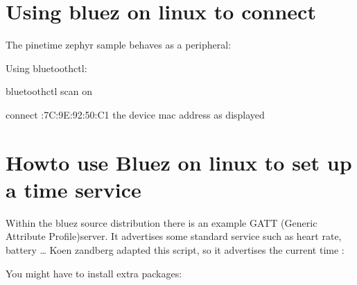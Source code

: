 \documentclass[letterpaper,10pt,english]{sphinxmanual}
\begin{document}
\section{Using bluez on linux to connect}
\label{\detokenize{current-time:using-bluez-on-linux-to-connect}}
The pinetime zephyr sample behaves as a peripheral:

\begin{sphinxVerbatim}[commandchars=\\\{\}]
\end{sphinxVerbatim}

Using bluetoothctl:

\begin{sphinxVerbatim}[commandchars=\\\{\}]
bluetoothctl
scan on


connect :7C:9E:92:50:C1 the device mac address as displayed
\end{sphinxVerbatim}


\section{Howto use Bluez on linux to set up a time service}
\label{\detokenize{current-time:howto-use-bluez-on-linux-to-set-up-a-time-service}}
Within the bluez source distribution there is an example GATT (Generic Attribute Profile)server. It advertises some standard service such as heart rate, battery …
Koen zandberg adapted this script, so it advertises the current time :

You might have to install extra packages:

\begin{sphinxVerbatim}[commandchars=\\\{\}]
\end{sphinxVerbatim}
\end{document}
